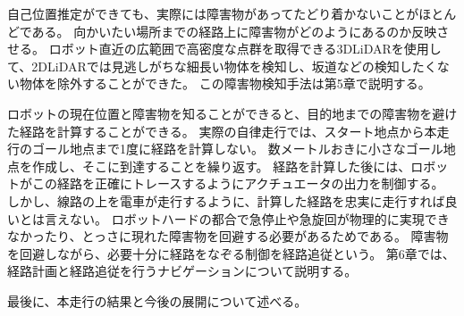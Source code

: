 自己位置推定ができても、実際には障害物があってたどり着かないことがほとんどである。
向かいたい場所までの経路上に障害物がどのようにあるのか反映させる。
ロボット直近の広範囲で高密度な点群を取得できる3DLiDARを使用して、2DLiDARでは見逃しがちな細長い物体を検知し、坂道などの検知したくない物体を除外することができた。
この障害物検知手法は第5章で説明する。

ロボットの現在位置と障害物を知ることができると、目的地までの障害物を避けた経路を計算することができる。
実際の自律走行では、スタート地点から本走行のゴール地点まで1度に経路を計算しない。
数メートルおきに小さなゴール地点を作成し、そこに到達することを繰り返す。
経路を計算した後には、ロボットがこの経路を正確にトレースするようにアクチュエータの出力を制御する。
しかし、線路の上を電車が走行するように、計算した経路を忠実に走行すれば良いとは言えない。
ロボットハードの都合で急停止や急旋回が物理的に実現できなかったり、とっさに現れた障害物を回避する必要があるためである。
障害物を回避しながら、必要十分に経路をなぞる制御を経路追従という。
第6章では、経路計画と経路追従を行うナビゲーションについて説明する。

最後に、本走行の結果と今後の展開について述べる。